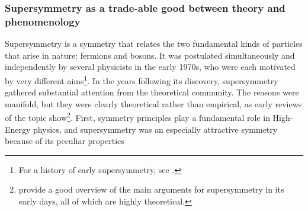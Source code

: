 \documentclass[smallextended]{svjour3}
\begin{document}

\subsubsection{Supersymmetry as a trade-able good between theory and phenomenology}

Supersymmetry is a symmetry that relates the two fundamental kinds of particles that arise in nature: fermions and bosons. It was postulated simultaneously and independently by several physicists in the early 1970s, who were each motivated by very different aims\footnote{%
For a history of early supersymmetry, see \citealt{kane2000the}.}. In the years following its discovery, supersymmetry gathered substantial attention from the theoretical community. The reasons were manifold, but they were clearly theoretical rather than empirical, as early reviews of the topic show\footnote{\citealt{Fayet1976cr,Freedman1978zi,Taylor1983su} provide a good overview of the main arguments for supersymmetry in its early days, all of which are highly theoretical.}. First, symmetry principles play a fundamental role in High-Energy physics, and supersymmetry was an especially attractive symmetry because of its peculiar properties%
\end{document}
